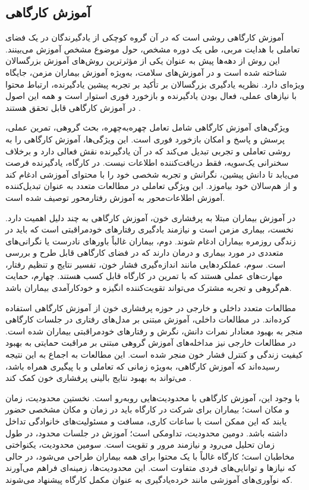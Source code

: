 \subsection{آموزش کارگاهی}
آموزش کارگاهی روشی است که در آن گروه کوچکی از یادگیرندگان در یک فضای تعاملی با هدایت مربی، طی یک دوره مشخص، حول موضوع مشخص آموزش می‌بینند. این روش از دهه‌ها پیش به عنوان یکی از مؤثرترین روش‌های آموزش بزرگسالان شناخته شده است و در آموزش‌های سلامت، به‌ویژه آموزش بیماران مزمن، جایگاه ویژه‌ای دارد. نظریه یادگیری بزرگسالان بر تأکید بر تجربه پیشین یادگیرنده، ارتباط محتوا با نیازهای عملی، فعال بودن یادگیرنده و بازخورد فوری استوار است و همه این اصول در آموزش کارگاهی قابل تحقق هستند \cite{knowles1980andragogy}.
\par
ویژگی‌های آموزش کارگاهی شامل تعامل چهره‌به‌چهره، بحث گروهی، تمرین عملی، پرسش و پاسخ و امکان بازخورد فوری است. این ویژگی‌ها، آموزش کارگاهی را به روشی تعاملی و تجربی تبدیل می‌کند که در آن یادگیرنده نقش فعالی دارد و برخلاف سخنرانی یک‌سویه، فقط دریافت‌کننده اطلاعات نیست. در کارگاه، یادگیرنده فرصت می‌یابد تا دانش پیشین، نگرانش و تجربه شخصی خود را با محتوای آموزشی ادغام کند و از هم‌سالان خود بیاموزد. این ویژگی تعاملی در مطالعات متعدد به عنوان تبدیل‌کننده آموزش اطلاعات‌محور به آموزش رفتارمحور توصیف شده است.
\par
در آموزش بیماران مبتلا به پرفشاری خون، آموزش کارگاهی به چند دلیل اهمیت دارد. نخست، بیماری مزمن است و نیازمند یادگیری رفتارهای خودمراقبتی است که باید در زندگی روزمره بیماران ادغام شوند. دوم، بیماران غالباً باورهای نادرست یا نگرانی‌های متعددی در مورد بیماری و درمان دارند که در فضای کارگاهی قابل طرح و بررسی است. سوم، عملکردهایی مانند اندازه‌گیری فشار خون، تفسیر نتایج و تنظیم رفتار، مهارت‌های عملی هستند که با تمرین در کارگاه قابل کسب هستند. چهارم، حمایت هم‌گروهی و تجربه مشترک می‌تواند تقویت‌کننده انگیزه و خودکارآمدی بیماران باشد.
\par
مطالعات متعدد داخلی و خارجی در حوزه پرفشاری خون از آموزش کارگاهی استفاده کرده‌اند. در مطالعات داخلی، آموزش مبتنی بر مدل‌های رفتاری در جلسات کارگاهی منجر به بهبود معنادار نمرات دانش، نگرش و رفتارهای خودمراقبتی بیماران شده است. در مطالعات خارجی نیز مداخله‌های آموزش گروهی مبتنی بر مراقبت حمایتی به بهبود کیفیت زندگی و کنترل فشار خون منجر شده است. این مطالعات به اجماع به این نتیجه رسیده‌اند که آموزش کارگاهی، به‌ویژه زمانی که تعاملی و با پیگیری همراه باشد، می‌تواند به بهبود نتایج بالینی پرفشاری خون کمک کند \cite{rakhshani2024precede,abedi2020precede,nasirian2019group,suprayitno2023telenursing,desouza2016flashcard,kurt2022selfmgmt}.
\par
با وجود این، آموزش کارگاهی با محدودیت‌هایی روبه‌رو است. نخستین محدودیت، زمان و مکان است؛ بیماران برای شرکت در کارگاه باید در زمان و مکان مشخصی حضور یابند که این ممکن است با ساعات کاری، مسافت و مسئولیت‌های خانوادگی تداخل داشته باشد. دومین محدودیت، تداومکی است؛ آموزش در جلسات محدود، در طول زمان تحلیل می‌رود و نیازمند مرور و تقویت است. سومین محدودیت، یکنواختی مخاطبان است؛ کارگاه غالباً با یک محتوا برای همه بیماران طراحی می‌شود، در حالی که نیازها و توانایی‌های فردی متفاوت است. این محدودیت‌ها، زمینه‌ای فراهم می‌آورند که نوآوری‌های آموزشی مانند خرده‌یادگیری به عنوان مکمل کارگاه پیشنهاد می‌شوند.

